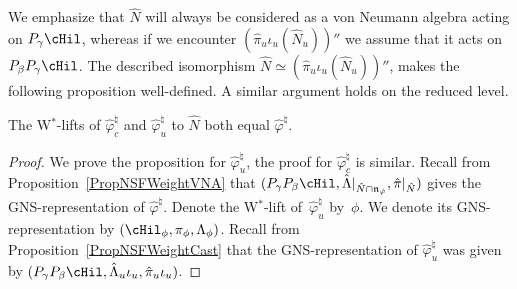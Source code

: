 We emphasize that $\hat{N}$ will always be considered as a von Neumann algebra acting on $P_\gamma \cHil$, whereas if we encounter $(\hat{\pi}_u\iota_u(\hat{N}_u)) ''$ we assume that it acts on $P_\beta P_\gamma \cHil$. The described isomorphism $\hat{N} \simeq (\hat{\pi}_u\iota_u(\hat{N}_u)) ''$, makes the following proposition well-def\/ined. A similar argument holds on the reduced level.

\begin{prop}\label{PropWAstLift}
The W$^\ast$-lifts of $\hat{\varphi}_{c}^\natural$ and $\hat{\varphi}_{u}^\natural$   to $\hat{N}$ both equal  $\hat{\varphi}^\natural$.
\end{prop}

\begin{proof}
We prove the proposition for $\hat{\varphi}_{u}^\natural$, the proof for $\hat{\varphi}_{c}^\natural$ is similar.
 Recall from Proposition~\ref{PropNSFWeightVNA} that $(P_\gamma P_\beta \cHil,   \hat{\Lambda}\vert_{\hat{N} \cap \mathfrak{n}_{\hat{\varphi}}} , \hat{\pi}\vert_{\hat{N}})$ gives the GNS-representation of $\hat{\varphi}^\natural$.
Denote the W$^\ast$-lift of~$\hat{\varphi}_{u}^\natural$ by~$\phi$. We denote its GNS-representation by $(\cHil_\phi, \pi_\phi, \Lambda_\phi)$. Recall from Proposition~\ref{PropNSFWeightCast} that the GNS-representation of $\hat{\varphi}_u^\natural$ was given by  $(P_\gamma P_\beta \cHil, \hat{\Lambda}_{u}  \iota_u, \hat{\pi}_{u}  \iota_u )$.


\end{proof}
